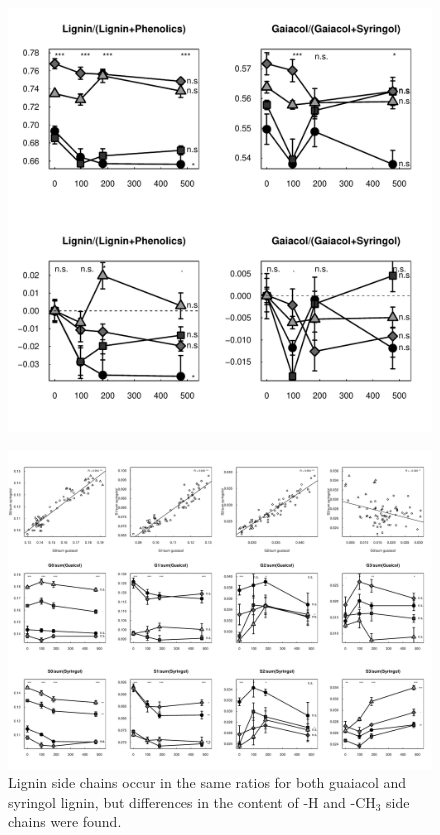 \documentclass[preprint,review,12pt]{elsarticle}
\begin{document}
\newpage
\begin{figure}[h!]
\begin{center}
\includegraphics{pyrpaper-g2syTS}
\end{center}
\caption{}
\label{fig:gsyph}
\end{figure}

\begin{figure}
\centering
{}
\includegraphics{pyrpaper-sidechainratios}
\caption{Lignin side chains occur in the same ratios for both guaiacol and syringol lignin, but differences in the content of -H and -CH$_3$ side chains were found.}
\label{fig:sidechainratios}
\end{figure}
\end{document}
